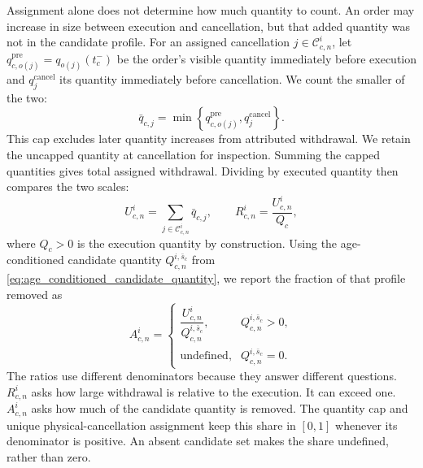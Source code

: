 \documentclass[11pt]{article}
\begin{document}
Assignment alone does not determine how much quantity to count. An order may increase in size between execution and cancellation, but that added quantity was not in the candidate profile. For an assigned cancellation $j\in\mathcal{C}_{c,n}^{i}$, let $q^{\mathrm{pre}}_{c,o(j)}=q_{o(j)}(t_c^{-})$ be the order's visible quantity immediately before execution and $q^{\mathrm{cancel}}_j$ its quantity immediately before cancellation. We count the smaller of the two:
\begin{equation}
    \bar q_{c,j}
    =
    \min\!\left\{q^{\mathrm{pre}}_{c,o(j)},q^{\mathrm{cancel}}_j\right\}.
    \label{eq:attributed_cancel_quantity}
\end{equation}
This cap excludes later quantity increases from attributed withdrawal. We retain the uncapped quantity at cancellation for inspection. Summing the capped quantities gives total assigned withdrawal. Dividing by executed quantity then compares the two scales:
\begin{equation}
    U^{i}_{c,n}=\sum_{j\in\mathcal{C}_{c,n}^{i}}\bar q_{c,j},
    \qquad
    R^{i}_{c,n}=\frac{U^{i}_{c,n}}{Q_c},
    \label{eq:assigned_withdrawal}
\end{equation}
where $Q_c>0$ is the execution quantity by construction. Using the age-conditioned candidate quantity
$Q^{i,\bar{s}_c}_{c,n}$ from \cref{eq:age_conditioned_candidate_quantity}, we report the fraction of that profile removed as
\begin{equation}
    A^{i}_{c,n}
    =\begin{cases}
    \dfrac{U^{i}_{c,n}}{Q^{i,\bar{s}_c}_{c,n}},
    & Q^{i,\bar{s}_c}_{c,n}>0,\\
    \text{undefined},
    & Q^{i,\bar{s}_c}_{c,n}=0.
    \end{cases}
    \label{eq:assigned_withdrawal_share}
\end{equation}
The ratios use different denominators because they answer different questions. $R^{i}_{c,n}$ asks how large withdrawal is relative to the execution. It can exceed one. $A^{i}_{c,n}$ asks how much of the candidate quantity is removed. The quantity cap and unique physical-cancellation assignment keep this share in $[0,1]$ whenever its denominator is positive. An absent candidate set makes the share undefined, rather than zero.
\end{document}

